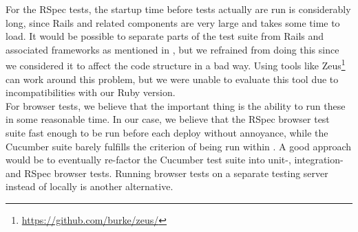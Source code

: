For the RSpec tests, the startup time before tests actually are run is
considerably long, since Rails and related components are very large and
takes some time to load. It would be possible to separate parts of the
test suite from Rails and associated frameworks as mentioned in
, but we refrained from doing this since we
considered it to affect the code structure in a bad way. Using tools
like Zeus\footnote{\url{https://github.com/burke/zeus/}} can work around
this problem, but we were unable to evaluate this tool due to
incompatibilities with our Ruby version.\\

For browser tests, we believe that the important thing is the ability to
run these in some reasonable time. In our case, we believe that the
RSpec browser test suite fast enough to be run before each deploy
without annoyance, while the Cucumber suite barely fulfills the
criterion of being run within . A good approach
would be to eventually re-factor the Cucumber test suite into unit-,
integration- and RSpec browser tests. Running browser tests on a
separate testing server instead of locally is another alternative.\\


